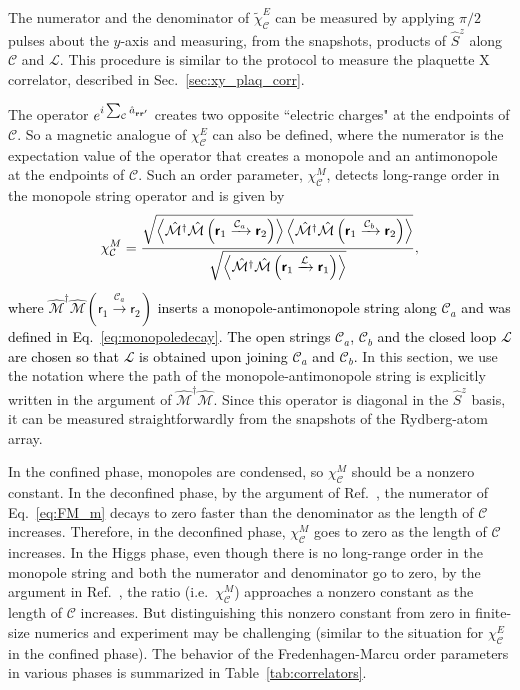 \documentclass[twocolumn,superscriptaddress,amsmath,amssymb,aps,prx,nofootinbib]{revtex4-2}
\newcommand{\dual}[1]{\boldsymbol{\mathsf{#1}}}
\newcommand{\newtext}[1]{\textcolor{black}{#1}}
\begin{document}
The numerator and the denominator of $\tilde{\chi}_\mathcal{C}^E$ can be measured by applying $\pi/2$ pulses about the $y$-axis and measuring, from the snapshots, products of $\hat{S}^z$ along $\mathcal{C}$ and $\mathcal{L}$. This procedure is similar to the protocol to measure the plaquette X correlator, described in Sec.~\ref{sec:xy_plaq_corr}. 

The operator $e^{i \sum_{\mathcal{C}} \hat{a}_{\vb{r} \vb{r}'}}$ creates two opposite ``electric charges" at the endpoints of $\mathcal{C}$. So a magnetic analogue of $\chi^E_\mathcal{C}$ can also be defined, where the  numerator is the expectation value of the operator that creates a monopole and an antimonopole at the endpoints of $\mathcal{C}$. Such an order parameter, $\chi_{\mathcal{C}}^M$, detects long-range order in the monopole string operator and is given by
\newtext{
\begin{equation}\label{eq:FM_m}
  \chi_{\mathcal{C}}^M = \frac{\sqrt{\expval{ \hat{\mathcal{M}}^{\dagger} \hat{\mathcal{M}}\left(\dual{r}_1 \xrightarrow{\mathcal{C}_a} \dual{r}_2\right) }\expval{ \hat{\mathcal{M}}^{\dagger} \hat{\mathcal{M}}\left(\dual{r}_1 \xrightarrow{\mathcal{C}_b} \dual{r}_2\right) }} }{  \sqrt{\expval{ \hat{\mathcal{M}}^{\dagger} \hat{\mathcal{M}}\left(\dual{r}_1 \xrightarrow{\mathcal{L}} \dual{r}_1\right)}}  },
\end{equation}
where $\hat{\mathcal{M}}^\dagger \hat{\mathcal{M}} (\dual{r}_1 \xrightarrow{\mathcal{C}_a} \dual{r}_2)$ inserts a monopole-antimonopole string along $\mathcal{C}_a$ and was defined in Eq.~\eqref{eq:monopoledecay}. The open strings $\mathcal{C}_a$, $\mathcal{C}_b$ and the closed loop $\mathcal{L}$ are chosen so that $\mathcal{L}$ is obtained upon joining $\mathcal{C}_a$ and $\mathcal{C}_b$.} In this section, we use the notation where the path of the monopole-antimonopole string is explicitly written in the argument of $\hat{\mathcal{M}}^\dagger \hat{\mathcal{M}}$. 
Since this operator is diagonal in the $\hat{S}^z$ basis, it can be measured straightforwardly from the snapshots of the Rydberg-atom array.

In the confined phase, monopoles are condensed, so $\chi_{\mathcal{C}}^M$ should be a nonzero constant. In the deconfined phase, by the argument of Ref.~\cite{fredenhagen1986}, the numerator of Eq.~\eqref{eq:FM_m} decays to zero faster than the denominator as the length of $\mathcal{C}$ increases. Therefore, in the deconfined phase, $\chi_{\mathcal{C}}^M$ goes to zero as the length of $\mathcal{C}$ increases. In the Higgs phase, even though there is no long-range order in the monopole string and both the numerator and denominator go to zero, by the argument in Ref.~\cite{fredenhagen1986}, the ratio (i.e.~$\chi_{\mathcal{C}}^M$) approaches a nonzero constant as the length of $\mathcal{C}$ increases. But distinguishing this nonzero constant from zero in finite-size numerics and experiment may be challenging (similar to the situation for $\chi_{\mathcal{C}}^E$ in the confined phase). The behavior of the Fredenhagen-Marcu order parameters in various phases is summarized in Table~\ref{tab:correlators}.
\end{document}
